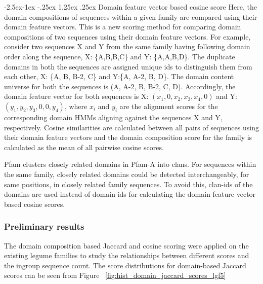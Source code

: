 \documentclass{article}
\makeatletter
\renewcommand\paragraph{\@startsection{paragraph}{4}{\z@}%
	{-2.5ex\@plus -1ex \@minus -.25ex}%
	{1.25ex \@plus .25ex}%
	{\normalfont\normalsize\bfseries}}
\makeatother
\begin{document}
		\paragraph{Domain feature vector based cosine score}
		Here, the domain compositions of sequences within a given family are compared using their domain feature vectors. This is a new scoring method for comparing domain compositions of two sequences using their domain feature vectors. For example, consider two sequences X and Y from the same family having following domain order along the sequence, X: \{A,B,B,C\} and Y: \{A,A,B,D\}. The duplicate domains in both the sequences are assigned unique ids to distinguish them from each other, X: \{A, B, B-2, C\} and Y:\{A, A-2, B, D\}. The domain content universe for both the sequences is (A, A-2, B, B-2, C, D). Accordingly, the domain feature vector for both sequences is X: $(x_{1}, 0, x_{2}, x_{3}, x_{4}, 0)$ and Y: $(y_{1}, y_{2}, y_{3}, 0, 0, y_{4})$, where $x_{i}$ and $y_{i}$ are the alignment scores for the corresponding domain HMMs aligning against the sequences X and Y, respectively. Cosine similarities are calculated between all pairs of sequences using their domain feature vectors and the domain composition score for the family is calculated as the mean of all pairwise cosine scores.
		
		Pfam clusters closely related domains in Pfam-A into clans. For sequences within the same family, closely related domains could be  detected interchangeably, for same positions, in closely related family sequences. To avoid this, clan-ids of the domains are used instead of domain-ids for calculating the domain feature vector based cosine scores.
		
		\subsubsection{Preliminary results}
		The domain composition based Jaccard and cosine scoring were applied on the existing legume families to study the relationships between different scores and the ingroup sequence count. The score distributions for domain-based Jaccard scores can be seen from Figure ~\ref{fig:hist_domain_jaccard_scores_lgf5}
		
\end{document}
